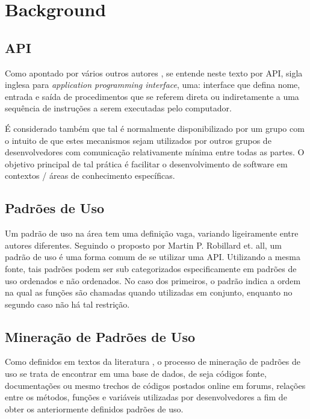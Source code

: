 \section{Background}
\subsection{API}
Como apontado por vários outros autores\cite{api_property_inference}
\cite{analyzing_temporal_api_usage_patterns}
\cite{recommender_system_software_engineering_nearest_neighbours}
\cite{probabilistic_api_miner}
\cite{google_oracle}, se entende
neste texto por API, sigla inglesa para \textit{application programming
interface}, uma: interface que defina nome, entrada e saída de procedimentos
que se referem direta ou indiretamente a uma sequência de instruções a serem
executadas pelo computador.

É considerado também que tal é normalmente disponibilizado por um grupo com o
intuito de que estes mecanismos sejam utilizados por outros grupos de
desenvolvedores com comunicação relativamente mínima entre todas as partes. O
objetivo principal de tal prática é facilitar o desenvolvimento de software em
contextos / áreas de conhecimento específicas.

\subsection{Padrões de Uso}
Um padrão de uso na área tem uma definição vaga, variando ligeiramente entre
autores diferentes. Seguindo o proposto por Martin P. Robillard et.
all\cite{api_property_inference}, um padrão de uso é uma forma comum de se
utilizar uma API. Utilizando a mesma fonte, tais padrões podem ser sub
categorizados especificamente em padrões de uso ordenados e não ordenados. No
caso dos primeiros, o padrão indica a ordem na qual as funções são chamadas
quando utilizadas em conjunto, enquanto no segundo caso não há tal restrição.

\subsection{Mineração de Padrões de Uso}

Como definidos em textos da literatura
\cite{analyzing_temporal_api_usage_patterns} \cite{api_property_inference}
\cite{probabilistic_api_miner}
\cite{recommender_system_software_engineering_nearest_neighbours}
\cite{pattern_from_lib_code} \cite{comp_mining_source_code}, o
processo de mineração de padrões de uso se trata de encontrar em uma base de
dados, de seja códigos fonte, documentações ou mesmo trechos de códigos postados
online em forums, relações entre os métodos, funções e variáveis utilizadas por
desenvolvedores a fim de obter os anteriormente definidos padrões de uso.

